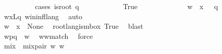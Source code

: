\begin{isabellebody}
\ \ \ \ \ \ \ \ \isamarkupfalse%
\ {\isacharparenleft}{\kern0pt}cases\ {\isachardoublequoteopen}is{\isacharunderscore}{\kern0pt}root\ q{\isachardoublequoteclose}{\isacharparenright}{\kern0pt}\isanewline
\ \ \ \ \ \ \ \ \ \ \isamarkupfalse%
\ True\isanewline
\ \ \ \ \ \ \ \ \ \ \isamarkupfalse%
\ \isamarkupfalse%
\ {\isachardoublequoteopen}{\isacharparenleft}{\kern0pt}w{\isacharprime}{\kern0pt}\ {\isasymsqdot}\ x{\isacharprime}{\kern0pt}{\isacharparenright}{\kern0pt}\ {\isasymin}\ {\isasymL}\ q{\isachardoublequoteclose}\ \isamarkupfalse%
\ w{\isacharprime}{\kern0pt}x{\isacharprime}{\kern0pt}{\isacharunderscore}{\kern0pt}Lq\ w{\isacharunderscore}{\kern0pt}in{\isacharunderscore}{\kern0pt}infl{\isacharunderscore}{\kern0pt}lang\ \isamarkupfalse%
\ auto\isanewline
\ \ \ \ \ \ \ \ \ \ \ \ \ \ \isanewline
\ \ \ \ \ \ \ \ \ \ \ \ \ \ \ \isanewline
\ \ \ \ \ \ \ \ \ \ \isamarkupfalse%
\ \isamarkupfalse%
\ {\isachardoublequoteopen}{\isacharparenleft}{\kern0pt}w{\isacharprime}{\kern0pt}\ {\isasymsqdot}\ x{\isacharprime}{\kern0pt}{\isacharparenright}{\kern0pt}\ {\isasymin}\ {\isasymT}\isactrlbsub None\isactrlesub {\isachardoublequoteclose}\ \isamarkupfalse%
\ root{\isacharunderscore}{\kern0pt}lang{\isacharunderscore}{\kern0pt}is{\isacharunderscore}{\kern0pt}mbox\ True\ \isamarkupfalse%
\ blast\ \isanewline
\ \ \ \ \ \ \ \ \ \ \ \ \ \ \isanewline
\ \ \ \ \ \ \ \ \ \ \isamarkupfalse%
\ {\isachardoublequoteopen}w{\isacharprime}{\kern0pt}{\isasymdown}\isactrlsub {\isacharbang}{\kern0pt}{\isasymdown}\isactrlsub {\isacharbraceleft}{\kern0pt}\isactrlsub p\isactrlsub {\isacharcomma}{\kern0pt}\isactrlsub q\isactrlsub {\isacharbraceright}{\kern0pt}{\isasymdown}\isactrlsub {\isacharbang}{\kern0pt}\isactrlsub {\isacharquery}{\kern0pt}\ {\isacharequal}{\kern0pt}\ w{\isasymdown}\isactrlsub {\isacharquery}{\kern0pt}{\isasymdown}\isactrlsub {\isacharbang}{\kern0pt}\isactrlsub {\isacharquery}{\kern0pt}{\isachardoublequoteclose}\ \isamarkupfalse%
\ w{\isacharprime}{\kern0pt}{\isacharunderscore}{\kern0pt}w{\isacharunderscore}{\kern0pt}match\ \isamarkupfalse%
\ force\isanewline
\ \ \ \ \ \ \ \ \ \ \ \ \ \ \isanewline
\ \ \ \ \ \ \ \ \ \ \ \ \ \ \isanewline
\ \ \ \ \ \ \ \ \ \ \isamarkupfalse%
\ {\isacharquery}{\kern0pt}mix\ {\isacharequal}{\kern0pt}\ {\isachardoublequoteopen}{\isacharparenleft}{\kern0pt}mix{\isacharunderscore}{\kern0pt}pair\ w{\isacharprime}{\kern0pt}\ w\ {\isacharbrackleft}{\kern0pt}{\isacharbrackright}{\kern0pt}{\isacharparenright}{\kern0pt}{\isachardoublequoteclose}\isanewline

\end{isabellebody}
